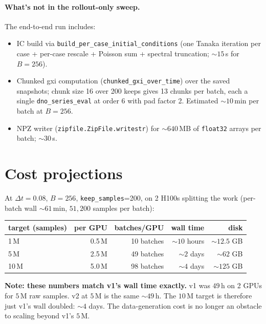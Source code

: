 \documentclass[11pt]{article}
\begin{document}
\paragraph{What's not in the rollout-only sweep.} The end-to-end run includes:
\begin{itemize}
\item IC build via \texttt{build\_per\_case\_initial\_conditions} (one Tanaka
  iteration per case + per-case rescale + Poisson sum + spectral truncation;
  $\sim\!15$\,s for $B=256$).
\item Chunked gxi computation (\texttt{chunked\_gxi\_over\_time}) over the saved
  snapshots; chunk size 16 over 200 keeps gives 13 chunks per batch, each a
  single \texttt{dno\_series\_eval} at order 6 with pad factor 2. Estimated
  $\sim\!10$\,min per batch at $B=256$.
\item NPZ writer (\texttt{zipfile.ZipFile.writestr}) for $\sim\!640$\,MB of
  \texttt{float32} arrays per batch; $\sim\!30$\,s.
\end{itemize}

\section{Cost projections}
\label{sec:projections}

At $\Delta t = 0.08$, $B = 256$, \texttt{keep\_samples}=200, on 2 H100s splitting the work
(per-batch wall $\sim 61$\,min, $51{,}200$ samples per batch):

\begin{center}
\begin{tabular}{lrrrr}
\toprule
target (samples) & per GPU & batches/GPU & wall time & disk \\
\midrule
1\,M  & 0.5\,M  & 10 batches  & $\sim\!10$ hours & $\sim\!12.5$ GB \\
5\,M  & 2.5\,M  & 49 batches  & $\sim\!2$ days   & $\sim\!62$ GB \\
10\,M & 5.0\,M  & 98 batches  & $\sim\!4$ days   & $\sim\!125$ GB \\
\bottomrule
\end{tabular}
\end{center}

\textbf{Note: these numbers match v1's wall time exactly.} v1 was $49$\,h on 2 GPUs
for $5$\,M raw samples. v2 at $5$\,M is the same $\sim\!49$\,h. The $10$\,M target
is therefore just v1's wall doubled: $\sim\!4$ days. The data-generation cost is
no longer an obstacle to scaling beyond v1's $5$\,M.
\end{document}

